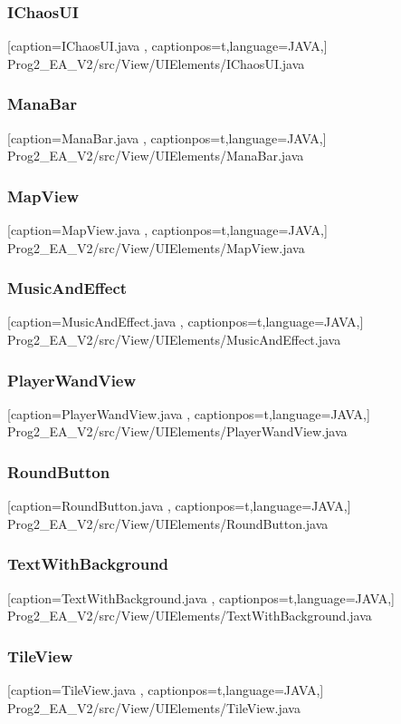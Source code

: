 \documentclass[a4paper,12pt]{scrartcl}
\begin{document}
	\subsubsection{IChaosUI}
	
	[caption={IChaosUI.java}
	\label{lst:javaclass},
	captionpos=t,language=JAVA,]
	{Prog2_EA_V2/src/View/UIElements/IChaosUI.java}
	\subsubsection{ManaBar}
	
	[caption={ManaBar.java}
	\label{lst:javaclass},
	captionpos=t,language=JAVA,]
	{Prog2_EA_V2/src/View/UIElements/ManaBar.java}
	\subsubsection{MapView}
	
	[caption={MapView.java}
	\label{lst:javaclass},
	captionpos=t,language=JAVA,]
	{Prog2_EA_V2/src/View/UIElements/MapView.java}
	\subsubsection{MusicAndEffect}
	
	[caption={MusicAndEffect.java}
	\label{lst:javaclass},
	captionpos=t,language=JAVA,]
	{Prog2_EA_V2/src/View/UIElements/MusicAndEffect.java}
	\subsubsection{PlayerWandView}
	
	[caption={PlayerWandView.java}
	\label{lst:javaclass},
	captionpos=t,language=JAVA,]
	{Prog2_EA_V2/src/View/UIElements/PlayerWandView.java}
	\subsubsection{RoundButton}
	
	[caption={RoundButton.java}
	\label{lst:javaclass},
	captionpos=t,language=JAVA,]
	{Prog2_EA_V2/src/View/UIElements/RoundButton.java}
	\subsubsection{TextWithBackground}
	
	[caption={TextWithBackground.java}
	\label{lst:javaclass},
	captionpos=t,language=JAVA,]
	{Prog2_EA_V2/src/View/UIElements/TextWithBackground.java}
	\subsubsection{TileView}
	
	[caption={TileView.java}
	\label{lst:javaclass},
	captionpos=t,language=JAVA,]
	{Prog2_EA_V2/src/View/UIElements/TileView.java}
\end{document}
